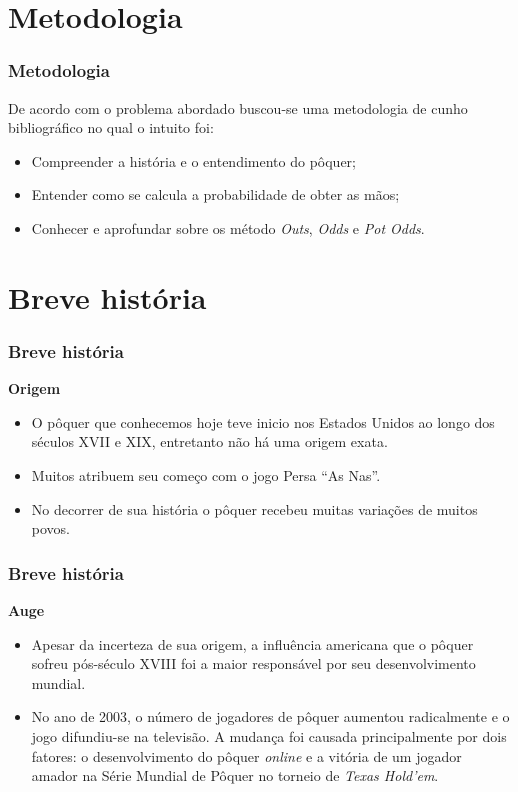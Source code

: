 \documentclass{beamer}
\begin{document}
\section{Metodologia}
\begin{frame}
\frametitle{Metodologia} 
De acordo com o problema abordado buscou-se uma metodologia de cunho bibliográfico no qual o intuito foi:\\

\begin{itemize}
\item Compreender a história e o entendimento do pôquer;
\item Entender como se calcula a probabilidade de obter as mãos; 
\item Conhecer e aprofundar sobre os método \textit{Outs}, \textit{Odds} e \textit{Pot Odds}.
\end{itemize}

\end{frame}



\section{Breve história}
\begin{frame}
\frametitle{Breve história} 
\begin{center}
{\Large \textbf{Origem}}
\end{center}
\begin{itemize}
\item{O pôquer que conhecemos hoje teve inicio nos Estados Unidos ao longo dos séculos XVII e XIX, entretanto não há uma origem exata.} 

\item{Muitos atribuem seu começo com o jogo Persa ``As Nas''.}

\item{No decorrer de sua história o pôquer recebeu muitas variações de muitos povos.}
\end{itemize}	
\end{frame}

\begin{frame}
\frametitle{Breve história}
\begin{center}
	{\Large \textbf{Auge}}
\end{center}
\begin{itemize}
\item Apesar da incerteza de sua origem, a influência americana que o pôquer sofreu pós-século XVIII foi a maior responsável por seu desenvolvimento mundial.

\item No ano de 2003, o número de jogadores de pôquer aumentou radicalmente e o jogo difundiu-se na televisão. A mudança foi causada principalmente por dois fatores: o desenvolvimento do pôquer \textit{online} e a vitória de um jogador amador na Série Mundial de Pôquer no torneio de \textit{Texas Hold'em}.
\end{itemize}
\end{frame}
\end{document}
